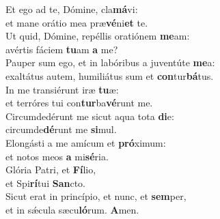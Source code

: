 \evenverse Et ego ad te, Dómine, cla\textbf{má}vi:~\*\\
\evenverse et mane orátio mea præ\textbf{vé}ni\textbf{et} te.\\
\oddverse Ut quid, Dómine, repéllis oratiónem \textbf{me}am:~\*\\
\oddverse avértis fáciem \textbf{tu}am \textbf{a} me?\\
\evenverse Pauper sum ego, et in labóribus a juventúte \textbf{me}a:~\*\\
\evenverse exaltátus autem, humiliátus sum et \textbf{con}tur\textbf{bá}tus.\\
\oddverse In me transiérunt iræ \textbf{tu}æ:~\*\\
\oddverse et terróres tui con\textbf{tur}ba\textbf{vé}runt me.\\
\evenverse Circumdedérunt me sicut aqua tota \textbf{di}e:~\*\\
\evenverse circumde\textbf{dé}runt me \textbf{si}mul.\\
\oddverse Elongásti a me amícum et \textbf{pró}ximum:~\*\\
\oddverse et notos meos \textbf{a} mi\textbf{sé}ria.\\
\evenverse Glória Patri, et \textbf{Fí}lio,~\*\\
\evenverse et Spi\textbf{rí}tui \textbf{San}cto.\\
\oddverse Sicut erat in princípio, et nunc, et \textbf{sem}per,~\*\\
\oddverse et in sǽcula sæcu\textbf{ló}rum. \textbf{A}men.\\
